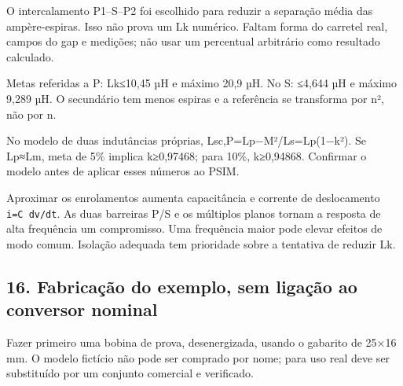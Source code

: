 \documentclass[
]{article}
\begin{document}
O intercalamento P1--S--P2 foi escolhido para reduzir a separação média
das ampère-espiras. Isso não prova um Lk numérico. Faltam forma do
carretel real, campos do gap e medições; não usar um percentual
arbitrário como resultado calculado.

Metas referidas a P: Lk≤10,45 µH e máximo 20,9 µH. No S: ≤4,644 µH e
máximo 9,289 µH. O secundário tem menos espiras e a referência se
transforma por n², não por n.

No modelo de duas indutâncias próprias, Lsc,P=Lp−M²/Ls=Lp(1−k²). Se
Lp≈Lm, meta de 5\% implica k≥0,97468; para 10\%, k≥0,94868. Confirmar o
modelo antes de aplicar esses números ao PSIM.

Aproximar os enrolamentos aumenta capacitância e corrente de
deslocamento \texttt{i=C\ dv/dt}. As duas barreiras P/S e os múltiplos
planos tornam a resposta de alta frequência um compromisso. Uma
frequência maior pode elevar efeitos de modo comum. Isolação adequada
tem prioridade sobre a tentativa de reduzir Lk.

\subsection{16. Fabricação do exemplo, sem ligação ao conversor
nominal}\label{fabricauxe7uxe3o-do-exemplo-sem-ligauxe7uxe3o-ao-conversor-nominal}

Fazer primeiro uma bobina de prova, desenergizada, usando o gabarito de
25×16 mm. O modelo fictício não pode ser comprado por nome; para uso
real deve ser substituído por um conjunto comercial e verificado.
\end{document}
